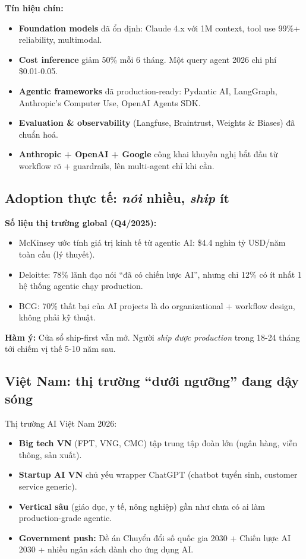 \documentclass[11pt,a4paper]{article}
\begin{document}
\textbf{Tín hiệu chín:}
\begin{itemize}
\item \textbf{Foundation models} đã ổn định: Claude 4.x với 1M context, tool use 99\%+ reliability, multimodal.
\item \textbf{Cost inference} giảm 50\% mỗi 6 tháng. Một query agent 2026 chi phí ~ \$0.01-0.05.
\item \textbf{Agentic frameworks} đã production-ready: Pydantic AI, LangGraph, Anthropic's Computer Use, OpenAI Agents SDK.
\item \textbf{Evaluation \& observability} (Langfuse, Braintrust, Weights \& Biases) đã chuẩn hoá.
\item \textbf{Anthropic + OpenAI + Google} công khai khuyến nghị bắt đầu từ workflow rõ + guardrails, lên multi-agent chỉ khi cần.
\end{itemize}

\subsection{Adoption thực tế: \textit{nói} nhiều, \textit{ship} ít}

\textbf{Số liệu thị trường global (Q4/2025):}
\begin{itemize}
\item McKinsey ước tính giá trị kinh tế từ agentic AI: \$4.4 nghìn tỷ USD/năm toàn cầu (lý thuyết).
\item Deloitte: 78\% lãnh đạo nói ``đã có chiến lược AI'', nhưng chỉ 12\% có ít nhất 1 hệ thống agentic chạy production.
\item BCG: 70\% thất bại của AI projects là do organizational + workflow design, không phải kỹ thuật.
\end{itemize}

\textbf{Hàm ý:} Cửa sổ ship-first vẫn mở. Người \textit{ship được production} trong 18-24 tháng tới chiếm vị thế 5-10 năm sau.

\subsection{Việt Nam: thị trường ``dưới ngưỡng'' đang dậy sóng}

Thị trường AI Việt Nam 2026:
\begin{itemize}
\item \textbf{Big tech VN} (FPT, VNG, CMC) tập trung tập đoàn lớn (ngân hàng, viễn thông, sản xuất).
\item \textbf{Startup AI VN} chủ yếu wrapper ChatGPT (chatbot tuyển sinh, customer service generic).
\item \textbf{Vertical sâu} (giáo dục, y tế, nông nghiệp) gần như chưa có ai làm production-grade agentic.
\item \textbf{Government push:} Đề án Chuyển đổi số quốc gia 2030 + Chiến lược AI 2030 + nhiều ngân sách dành cho ứng dụng AI.
\end{itemize}
\end{document}
